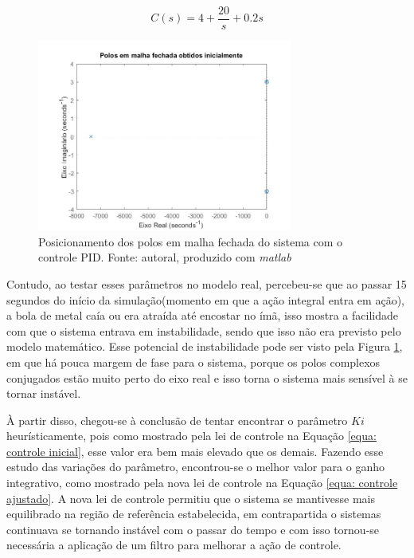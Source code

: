\documentclass{ifacconf}
\begin{document}
\begin{equation}
  C(s) = 4 + \frac{20}{s} + 0.2s
  \label{equa: controle inicial}
\end{equation}

\begin{figure}[!htb]
  \begin{center}
  \includegraphics[width=8.4cm]{figures/lei pid inicial.jpg}    %
  \caption{Posicionamento dos polos em malha fechada do sistema com o controle PID. Fonte: autoral, produzido com \textit{matlab}} 
  \label{fig:pid_inicial}
  \end{center}
\end{figure}

Contudo, ao testar esses parâmetros no modelo real, percebeu-se que ao passar 15 segundos do início da simulação(momento em que a ação integral entra em ação),
a bola de metal caía ou era atraída até encostar no ímã, isso mostra a facilidade com que o sistema entrava em instabilidade, sendo que isso não era previsto pelo modelo matemático. Esse 
potencial de instabilidade pode ser visto pela Figura \ref{fig:pid_inicial}, em que há pouca margem de fase para o sistema, porque os polos complexos conjugados estão muito perto do eixo 
real e isso torna o sistema mais sensível à se tornar instável.

À partir disso, chegou-se à conclusão de tentar encontrar o parâmetro $Ki$ heurísticamente, pois como mostrado pela lei de controle na Equação \ref{equa: controle inicial}, esse valor era bem mais elevado que os demais. 
Fazendo esse estudo das variações do parâmetro, encontrou-se o melhor valor para o ganho integrativo, como mostrado pela nova lei de controle na Equação \ref{equa: controle ajustado}. A nova lei de controle permitiu que 
o sistema se mantivesse mais equilibrado na região de referência estabelecida, em contrapartida o sistemas continuava se tornando instável com o passar do tempo e com isso tornou-se necessária 
a aplicação de um filtro para melhorar a ação de controle.
\end{document}
